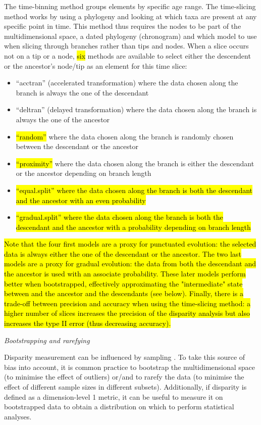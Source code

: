\documentclass[12pt,letterpaper]{article}
\renewcommand{\subsection}[1]{%
\bigskip
\begin{center}
\begin{large}
\normalfont\itshape #1
\end{large}
\end{center}}
\begin{document}
The time-binning method groups elements by specific age range.
The time-slicing method works by using a phylogeny and looking at which taxa are present at any specific point in time.
This method thus requires the nodes to be part of the multidimensional space, a dated phylogeny (chronogram) and which model to use when slicing through branches rather than tips and nodes.
When a slice occurs not on a tip or a node, \hl{six} methods are available to select either the descendent or the ancestor's node/tip as an element for this time slice:
\begin{itemize}
    \item ``acctran'' (accelerated transformation) where the data chosen along the branch is always the one of the descendant
    \item ``deltran'' (delayed transformation) where the data chosen along the branch is always the one of the ancestor
    \item \hl{``random''} where the data chosen along the branch is randomly chosen between the descendant or the ancestor
    \item \hl{``proximity''} where the data chosen along the branch is either the descendant or the ancestor depending on branch length
    \item \hl{``equal.split'' where the data chosen along the branch is both the descendant and the ancestor with an even probability}
    \item \hl{``gradual.split'' where the data chosen along the branch is both the descendant and the ancestor with a probability depending on branch length}
\end{itemize}

\hl{Note that the four first models are a proxy for punctuated evolution: the selected data is always either the one of the descendant or the ancestor.
The two last models are a proxy for gradual evolution: the data from both the descendant and the ancestor is used with an associate probability.
These later models perform better when bootstrapped, effectively approximating the "intermediate" state between and the ancestor and the descendants (see below).
Finally, there is a trade-off between precision and accuracy when using the time-slicing method: a higher number of slices increases the precision of the disparity analysis but also increases the type II error (thus decreasing accuracy).}

\subsection{Bootstrapping and rarefying}
Disparity measurement can be influenced by sampling \citep{Butler2012}.
To take this source of bias into account, it is common practice to bootstrap the multidimensional space (to minimise the effect of outliers) or/and to rarefy the data (to minimise the effect of different sample sizes in different subsets).
Additionally, if disparity is defined as a dimension-level 1 metric, it can be useful to measure it on bootstrapped data to obtain a distribution on which to perform statistical analyses.
\end{document}
